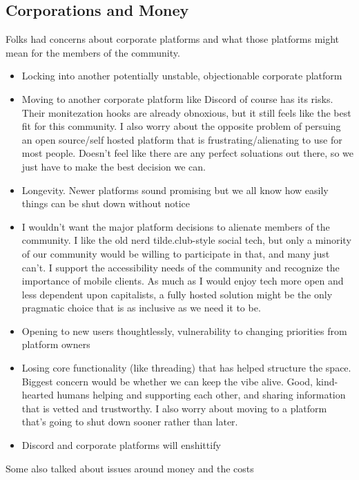 \documentclass[
]{book}
\providecommand{\tightlist}{%
  \setlength{\itemsep}{0pt}\setlength{\parskip}{0pt}}
\begin{document}
\subsection{Corporations and Money}\label{corporations-and-money}

Folks had concerns about corporate platforms and what those platforms might mean for the members of the community.

\begin{itemize}
\tightlist
\item
  Locking into another potentially unstable, objectionable corporate platform
\item
  Moving to another corporate platform like Discord of course has its risks. Their monitezation hooks are already obnoxious, but it still feels like the best fit for this community. I also worry about the opposite problem of persuing an open source/self hosted platform that is frustrating/alienating to use for most people. Doesn't feel like there are any perfect soluations out there, so we just have to make the best decision we can.
\item
  Longevity. Newer platforms sound promising but we all know how easily things can be shut down without notice
\item
  I wouldn't want the major platform decisions to alienate members of the community. I like the old nerd tilde.club-style social tech, but only a minority of our community would be willing to participate in that, and many just can't. I support the accessibility needs of the community and recognize the importance of mobile clients. As much as I would enjoy tech more open and less dependent upon capitalists, a fully hosted solution might be the only pragmatic choice that is as inclusive as we need it to be.
\item
  Opening to new users thoughtlessly, vulnerability to changing priorities from platform owners
\item
  Losing core functionality (like threading) that has helped structure the space. Biggest concern would be whether we can keep the vibe alive. Good, kind-hearted humans helping and supporting each other, and sharing information that is vetted and trustworthy. I also worry about moving to a platform that's going to shut down sooner rather than later.
\item
  Discord and corporate platforms will enshittify
\end{itemize}

Some also talked about issues around money and the costs
\end{document}
